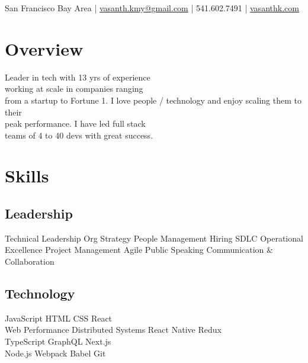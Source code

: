 \documentclass[]{my-resume-openfont}
\begin{document}
%
%

{ San Francisco Bay Area 
| \href{mailto:vasanth.kmy@gmail.com}{vasanth.kmy@gmail.com} 
| 541.602.7491 
| \href{http://www.vasanthk.com}{vasanthk.com} \\
}

%
%

\begin{minipage}[t]{0.33\textwidth} 


\section{Overview}
Leader in tech with 13 yrs of experience\\working at scale in companies ranging \\from a startup to Fortune 1. I love people / technology and enjoy scaling them to their \\peak performance. I have led full stack \\teams of 4 to 40 devs with great success.


\section{Skills}
\subsection{Leadership}
Technical Leadership \textbullet{} Org Strategy \textbullet{} People Management \textbullet{} Hiring \textbullet{} SDLC 
Operational Excellence \textbullet{} 
Project Management \textbullet{} Agile  \textbullet{} Public Speaking 
Communication \& Collaboration

\sectionsep

\subsection{Technology}
JavaScript \textbullet{} HTML \textbullet{} CSS \textbullet{} React \textbullet{}\\
Web Performance \textbullet{} Distributed Systems \textbullet{} 
React Native \textbullet{} Redux \textbullet{} \\ 
TypeScript \textbullet{} GraphQL \textbullet{} Next.js \textbullet{} \\
Node.js \textbullet{} Webpack \textbullet{} Babel \textbullet{} Git


\end{minipage}
\end{document}
